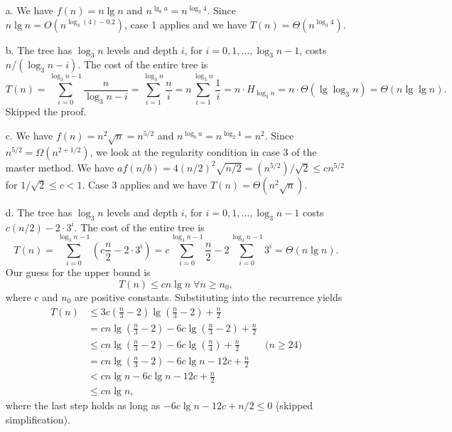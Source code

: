 \documentclass{report}
\makeatletter
\renewenvironment{framed}{%
 \def\FrameCommand##1{\hskip\@totalleftmargin
 \fboxsep=\FrameSep\fbox{##1}}%
 \MakeFramed {\advance\hsize-\width
   \@totalleftmargin\z@ \linewidth\hsize
   \@setminipage}}%
 {\par\unskip\endMakeFramed}
\DeclareMathOperator{\Forall}{\forall}
\makeatother
\begin{document}
\begin{enumerate}
\begin{framed}
  \begin{enumerate}
    \item[a.] We have $f(n) = n \lg n$ and $n^{\lg_b a} = n^{\log_3 4}$.
      Since $n \lg n = O(n^{\log_3(4) - 0.2})$, case 1 applies and we have
      $T(n) = \Theta(n^{\log_3 4})$.
    \item[b.] The tree has $\log_3 n$ levels and depth $i$, for $i = 0, 1,
      \dots, \log_3 n - 1$, costs $n/(\log_3 n - i)$. The cost of the entire
      tree is
      \[
        T(n) = \sum_{i = 0}^{\log_3 n - 1} \frac{n}{\log_3 n - i}
             = \sum_{i = 1}^{\log_3 n} \frac{n}{i}
             = n \sum_{i = 1}^{\log_3 n} \frac{1}{i}
             = n \cdot H_{\log_3 n}
             = n \cdot \Theta(\lg \log_3 n)
             = \Theta(n \lg \lg n).
      \]
      Skipped the proof.
    \item[c.] We have $f(n) = n^2 \sqrt n = n^{5/2}$ and
      $n^{\log_b a} = n^{\log_2 4} = n^2$. Since
      $n^{5/2} = \Omega(n^{2 + 1/2})$, we look at the regularity condition in
      case 3 of the master method. We have
      $af(n/b) = 4(n/2)^2 \sqrt{n/2} = (n^{5/2})/\sqrt 2 \le c n^{5/2}$ for
      $1/\sqrt 2 \le c < 1$. Case 3 applies and we have
      $T(n) = \Theta(n^2 \sqrt n)$.
    \item[d.]
      The tree has $\log_3 n$ levels and depth $i$, for
      $i = 0, 1, \dots, \log_3 n - 1$ costs $c (n/2) - 2 \cdot 3^i$. The cost of
      the entire tree is
      \[
        T(n) = \sum_{i = 0}^{\log_3 n - 1} \left(c \frac{n}{2} - 2 \cdot 3^i\right)
             = c \sum_{i = 0}^{\log_3 n - 1} \frac{n}{2} - 2 \sum_{i = 0}^{\log_3 n - 1} 3^i
             = \Theta(n \lg n).
      \]
      Our guess for the upper bound is
      \[
      T(n) \le c n \lg n \; \Forall n \ge n_0,
      \]
      where $c$ and $n_0$ are positive constants. Substituting into the recurrence
      yields
      \begin{equation*}
      \begin{aligned}
        T(n) &\le 3c \left(\frac{n}{3} - 2\right) \lg \left(\frac{n}{3} - 2\right) + \frac{n}{2}\\
             &=   c n \lg \left(\frac{n}{3} - 2\right) - 6c \lg \left(\frac{n}{3} - 2\right) + \frac{n}{2}\\
             &\le cn \lg \left(\frac{n}{3} - 2\right) - 6c \lg \left(\frac{n}{4}\right) + \frac{n}{2} & \text{($n \ge 24$)}\\
             &=   cn \lg \left(\frac{n}{3} - 2\right) - 6c \lg n - 12 c + \frac{n}{2}\\
             &<   cn \lg n - 6c \lg n - 12c + \frac{n}{2}\\
             &\le cn \lg n,
      \end{aligned}
      \end{equation*}
      where the last step holds as long as $-6c \lg n - 12c + n/2 \le 0$
      (skipped simplification).


\end{enumerate}
\end{framed}
\end{enumerate}
\end{document}
